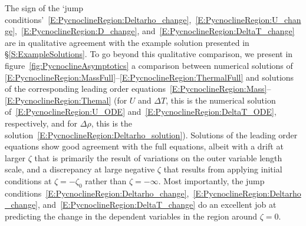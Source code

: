 \documentclass[openacc]{rsproca_new}%
\begin{document}
The sign of the `jump conditions'~\eqref{E:PycnoclineRegion:Deltarho_change},~\eqref{E:PycnoclineRegion:U_change},~\eqref{E:PycnoclineRegion:D_change}, and~\eqref{E:PycnoclineRegion:DeltaT_change} are in qualitative agreement with the example solution presented in \S\ref{S:ExampleSolutions}. To go beyond this qualitative comparison, we present in figure~\ref{fig:PycnoclineAsymptotics} a comparison between numerical solutions of \eqref{E:PycnoclineRegion:MassFull}--\eqref{E:PycnoclineRegion:ThermalFull} and solutions of the corresponding leading order equations~\eqref{E:PycnoclineRegion:Mass}--\eqref{E:PycnoclineRegion:Themal}  (for $U$ and $\Delta T$, this is the numerical solution of~\eqref{E:PycnoclineRegion:U_ODE} and~\eqref{E:PycnoclineRegion:DeltaT_ODE}, respectively, and for $\Delta \rho$, this is the solution~\eqref{E:PycnoclineRegion:Deltarho_solution}). Solutions of the leading order equations show good agreement with the full equations, albeit with a drift at larger $\zeta$ that is primarily the result of variations on the outer variable length scale, and a discrepancy at large negative $\zeta$ that results from applying  initial conditions at $\zeta = -\zeta_0$ rather than $\zeta = -\infty$. Most importantly, the jump conditions~\eqref{E:PycnoclineRegion:Deltarho_change},~\eqref{E:PycnoclineRegion:Deltarho_change}, and~\eqref{E:PycnoclineRegion:DeltaT_change} do an excellent job at predicting the change in the dependent variables in the region around $\zeta = 0$.

\end{document}
